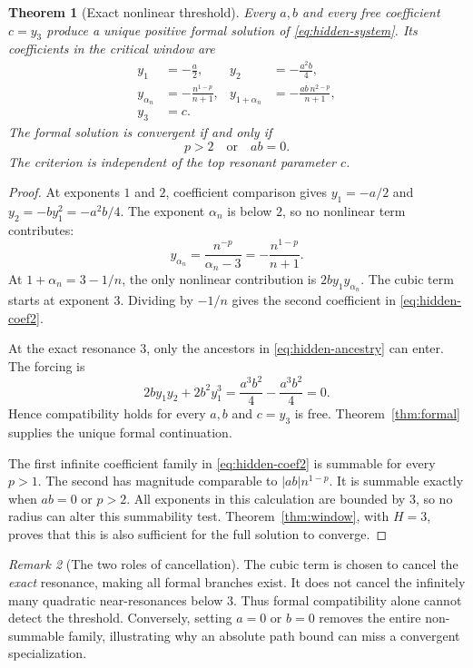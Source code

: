 \documentclass[11pt,a4paper]{article}
\numberwithin{equation}{section}
\newtheorem{theorem}{Theorem}[section]
\theoremstyle{definition}
\theoremstyle{remark}
\newtheorem{remark}[theorem]{Remark}
\begin{document}
\begin{theorem}[Exact nonlinear threshold]\label{thm:hidden}
Every $a,b$ and every free coefficient $c=y_3$ produce a unique positive
formal solution of \eqref{eq:hidden-system}. Its coefficients in the
critical window are
\begin{align}
 y_1&=-\frac a2,&y_2&=-\frac{a^2b}{4},\label{eq:hidden-coef1}\\
 y_{\alpha_n}&=-\frac{n^{1-p}}{n+1},&
 y_{1+\alpha_n}&=-\frac{ab\,n^{2-p}}{n+1},\label{eq:hidden-coef2}\\
 y_3&=c.\label{eq:hidden-coef3}
\end{align}
The formal solution is convergent if and only if
\begin{equation}\label{eq:hidden-threshold}
 p>2\quad\text{or}\quad ab=0.
\end{equation}
The criterion is independent of the top resonant parameter $c$.
\end{theorem}
\begin{proof}
At exponents $1$ and $2$, coefficient comparison gives
$y_1=-a/2$ and $y_2=-b y_1^2=-a^2b/4$.
The exponent $\alpha_n$ is below $2$, so no nonlinear term contributes:
\[
 y_{\alpha_n}=\frac{n^{-p}}{\alpha_n-3}
             =-\frac{n^{1-p}}{n+1}.
\]
At $1+\alpha_n=3-1/n$, the only nonlinear contribution is
$2b y_1y_{\alpha_n}$. The cubic term starts at exponent $3$.
Dividing by $-1/n$ gives the second coefficient in
\eqref{eq:hidden-coef2}.

At the exact resonance $3$, only the ancestors in
\eqref{eq:hidden-ancestry} can enter. The forcing is
\[
 2b y_1y_2+2b^2y_1^3
 =\frac{a^3b^2}{4}-\frac{a^3b^2}{4}=0.
\]
Hence compatibility holds for every $a,b$ and $c=y_3$ is free.
Theorem~\ref{thm:formal} supplies the unique formal continuation.

The first infinite coefficient family in \eqref{eq:hidden-coef2} is
summable for every $p>1$. The second has magnitude comparable to
$|ab|n^{1-p}$. It is summable exactly when $ab=0$ or $p>2$.
All exponents in this calculation are bounded by $3$, so no radius can
alter this summability test. Theorem~\ref{thm:window}, with $H=3$,
proves that this is also sufficient for the full solution to converge.
\end{proof}

\begin{remark}[The two roles of cancellation]
The cubic term is chosen to cancel the \emph{exact} resonance, making all
formal branches exist. It does not cancel the infinitely many quadratic
near-resonances below $3$. Thus formal compatibility alone cannot detect
the threshold. Conversely, setting $a=0$ or $b=0$ removes the entire
non-summable family, illustrating why an absolute path bound can miss a
convergent specialization.
\end{remark}
\end{document}
